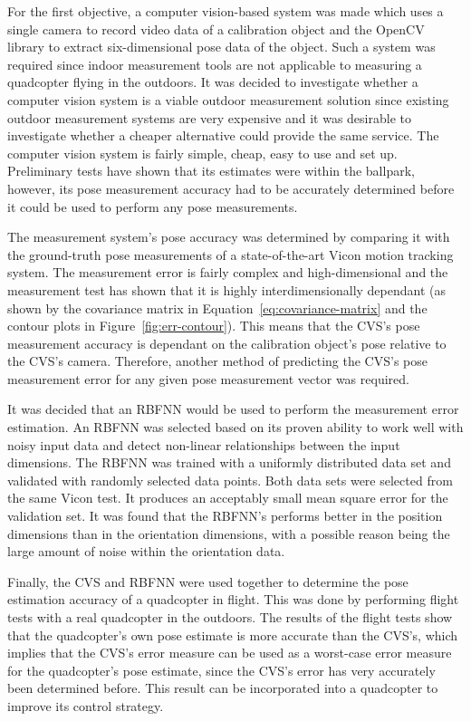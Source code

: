 For the first objective, a computer vision-based system was made which uses a single camera to record video data of a calibration object and the OpenCV library to extract six-dimensional pose data of the object. Such a system was required since indoor measurement tools are not applicable to measuring a quadcopter flying in the outdoors. It was decided to investigate whether a computer vision system is a viable outdoor measurement solution since existing outdoor measurement systems are very expensive and it was desirable to investigate whether a cheaper alternative could provide the same service. The computer vision system is fairly simple, cheap, easy to use and set up. Preliminary tests have shown that its estimates were within the ballpark, however, its pose measurement accuracy had to be accurately determined before it could be used to perform any pose measurements. 

The measurement system's pose accuracy was determined by comparing it with the ground-truth pose measurements of a state-of-the-art Vicon motion tracking system. The measurement error is fairly complex and high-dimensional and the measurement test has shown that it is highly interdimensionally dependant (as shown by the covariance matrix in Equation~\ref{eq:covariance-matrix} and the contour plots in Figure~\ref{fig:err-contour}). This means that the CVS's pose measurement accuracy is dependant on the calibration object's pose relative to the CVS's camera. Therefore, another method of predicting the CVS's pose measurement error for any given pose measurement vector was required.

It was decided that an RBFNN would be used to perform the measurement error estimation. An RBFNN was selected based on its proven ability to work well with noisy input data and detect non-linear relationships between the input dimensions. The RBFNN was trained with a uniformly distributed data set and validated with randomly selected data points. Both data sets were selected from the same Vicon test. It produces an acceptably small mean square error for the validation set. It was found that the RBFNN's performs better in the position dimensions than in the orientation dimensions, with a possible reason being the large amount of noise within the orientation data. 

Finally, the CVS and RBFNN were used together to determine the pose estimation accuracy of a quadcopter in flight. This was done by performing flight tests with a real quadcopter in the outdoors. The results of the flight tests show that the quadcopter's own pose estimate is more accurate than the CVS's, which implies that the CVS's error measure can be used as a worst-case error measure for the quadcopter's pose estimate, since the CVS's error has very accurately been determined before. This result can be incorporated into a quadcopter to improve its control strategy.

